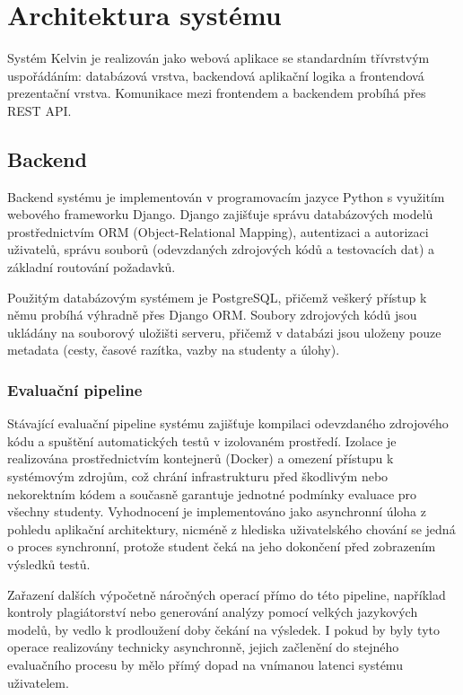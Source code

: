 \section{Architektura systému}
\label{sec:kelvin-architecture}

Systém Kelvin je realizován jako webová aplikace se standardním třívrstvým uspořádáním: databázová vrstva, backendová aplikační logika a frontendová prezentační vrstva.
Komunikace mezi frontendem a backendem probíhá přes REST API\@.

\subsection{Backend}
\label{subsec:kelvin-backend}

Backend systému je implementován v programovacím jazyce Python s využitím webového frameworku Django.
Django zajišťuje správu databázových modelů prostřednictvím ORM (Object-Relational Mapping), autentizaci a autorizaci uživatelů, správu souborů (odevzdaných zdrojových kódů a testovacích dat) a základní routování požadavků.

Použitým databázovým systémem je PostgreSQL, přičemž veškerý přístup k němu probíhá výhradně přes Django ORM\@.
Soubory zdrojových kódů jsou ukládány na souborový uložišti serveru, přičemž v databázi jsou uloženy pouze metadata (cesty, časové razítka, vazby na studenty a úlohy).

\subsubsection*{Evaluační pipeline}
\label{subsubsec:kelvin-evaluation-pipeline}

Stávající evaluační pipeline systému zajišťuje kompilaci odevzdaného zdrojového kódu a spuštění automatických testů v izolovaném prostředí.
Izolace je realizována prostřednictvím kontejnerů (Docker) a omezení přístupu k systémovým zdrojům, což chrání infrastrukturu před škodlivým nebo nekorektním kódem a současně garantuje jednotné podmínky evaluace pro všechny studenty.
Vyhodnocení je implementováno jako asynchronní úloha z pohledu aplikační architektury, nicméně z hlediska uživatelského chování se jedná o proces synchronní, protože student čeká na jeho dokončení před zobrazením výsledků testů.

Zařazení dalších výpočetně náročných operací přímo do této pipeline, například kontroly plagiátorství nebo generování analýzy pomocí velkých jazykových modelů, by vedlo k prodloužení doby čekání na výsledek.
I pokud by byly tyto operace realizovány technicky asynchronně, jejich začlenění do stejného evaluačního procesu by mělo přímý dopad na vnímanou latenci systému uživatelem.

